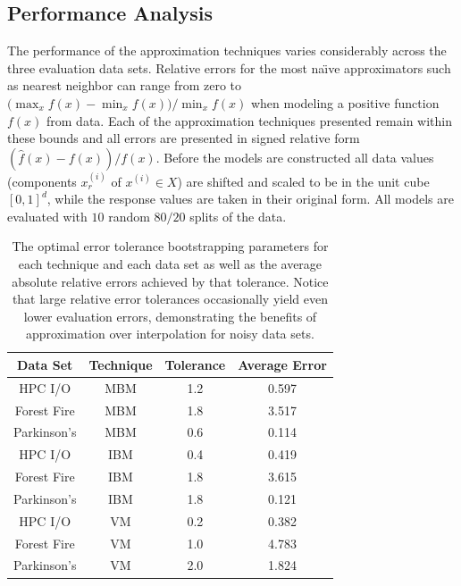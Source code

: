 \subsection{Performance Analysis}
\label{sec_performance_analysis}

The performance of the approximation techniques varies considerably across the three evaluation data sets. Relative errors for the most na\"{\i}ve approximators such as nearest neighbor can range from zero to $\displaystyle \big(\max_x f(x) - \min_x f(x)\big) / \min_x f(x)$ when modeling a positive function $f(x)$ from data. Each of the approximation techniques presented remain within these bounds and all errors are presented in signed relative form $(\hat f(x) - f(x)) / f(x)$. Before the models are constructed all data values (components $x^{(i)}_r$ of $x^{(i)} \in X$) are shifted and scaled to be in the unit cube $[0,1]^d$, while the response values are taken in their original form. All models are evaluated with $10$ random $80/20$ splits of the data.

\begin{table}
  \centering
  \begin{tabular}{c|c|c|c}
    \hline
    \textbf{Data Set} & \textbf{Technique} & \textbf{Tolerance} & \textbf{Average Error}\\
    \hline
    HPC I/O & MBM & 1.2 & 0.597\\
    Forest Fire & MBM & 1.8 & 3.517\\
    Parkinson's & MBM & 0.6 & 0.114\\
    \hline
    HPC I/O & IBM & 0.4 & 0.419\\
    Forest Fire & IBM & 1.8 & 3.615\\
    Parkinson's & IBM & 1.8 & 0.121\\
    \hline
    HPC I/O & VM & 0.2 & 0.382\\
    Forest Fire & VM & 1.0 & 4.783\\
    Parkinson's & VM & 2.0 & 1.824\\
    \hline
  \end{tabular}
  \caption{The optimal error tolerance bootstrapping parameters for each technique and each data set as well as the average absolute relative errors achieved by that tolerance. Notice that large relative error tolerances occasionally yield even lower evaluation errors, demonstrating the benefits of approximation over interpolation for noisy data sets.
  \vspace{-.5cm}}
  \label{tab_optimal_tolerance}
\end{table}

